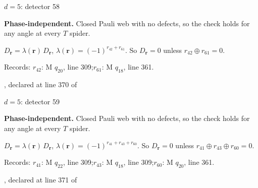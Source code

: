 \label{d5_det058}
{\Large $d=5$: detector 58}\par
\textbf{Phase-independent.} Closed Pauli web with no defects, so the check holds for any angle at every $T$ spider.
\begin{center}
\end{center}
\vspace{-1mm}
$D_{\boldsymbol r}=\lambda(\boldsymbol r)\,D_{\boldsymbol r}$, \quad $\lambda(\boldsymbol r)=(-1)^{r_{42}+r_{61}}$. \qquad So $D_{\boldsymbol r}=0$ unless $r_{42}\oplus r_{61}=0$.
\par\smallskip\begin{minipage}{.98\linewidth}\small Records: $r_{42}$: M $q_{20}$, line 309;\quad $r_{61}$: M $q_{18}$, line 361.\end{minipage}
\vfill
{\footnotesize\texttt{}, declared at line 370 of \texttt{}}
\newpage

\label{d5_det059}
{\Large $d=5$: detector 59}\par
\textbf{Phase-independent.} Closed Pauli web with no defects, so the check holds for any angle at every $T$ spider.
\begin{center}
\end{center}
\vspace{-1mm}
$D_{\boldsymbol r}=\lambda(\boldsymbol r)\,D_{\boldsymbol r}$, \quad $\lambda(\boldsymbol r)=(-1)^{r_{41}+r_{43}+r_{60}}$. \qquad So $D_{\boldsymbol r}=0$ unless $r_{41}\oplus r_{43}\oplus r_{60}=0$.
\par\smallskip\begin{minipage}{.98\linewidth}\small Records: $r_{41}$: M $q_{22}$, line 309;\quad $r_{43}$: M $q_{18}$, line 309;\quad $r_{60}$: M $q_{20}$, line 361.\end{minipage}
\vfill
{\footnotesize\texttt{}, declared at line 371 of \texttt{}}
\newpage

